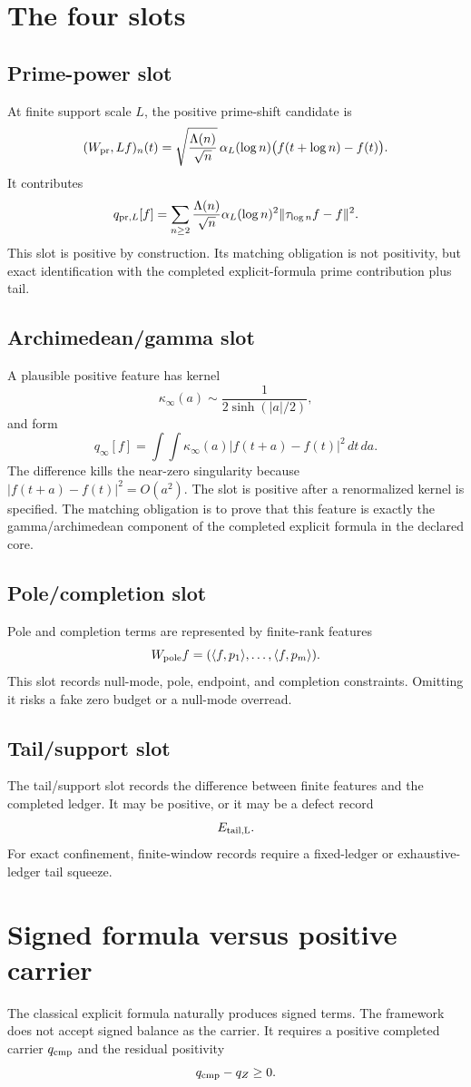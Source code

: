 \documentclass[11pt]{article}
\newcommand{\Wpr}{W_{\rm pr}}
\newcommand{\Wpole}{W_{\rm pole}}
\begin{document}
\section{The four slots}
\subsection{Prime-power slot}
At finite support scale \(L\), the positive prime-shift candidate is
\[
(\Wpr,L f)_n(t)
=\sqrt{\frac{\Lambda(n)}{\sqrt n}}\,\alpha_L(\log n)\bigl(f(t+\log n)-f(t)\bigr).
\]
It contributes
\[
q_{{\rm pr},L}[f]
=\sum_{n\ge2}\frac{\Lambda(n)}{\sqrt n}\alpha_L(\log n)^2\|\tau_{\log n}f-f\|^2.
\]
This slot is positive by construction. Its matching obligation is not positivity, but exact identification with the completed explicit-formula prime contribution plus tail.

\subsection{Archimedean/gamma slot}
A plausible positive feature has kernel
\[
\kappa_\infty(a)\sim \frac{1}{2\sinh(|a|/2)},
\]
and form
\[
q_\infty[f]=\int\!\int\kappa_\infty(a)|f(t+a)-f(t)|^2\,dt\,da.
\]
The difference kills the near-zero singularity because \(|f(t+a)-f(t)|^2=O(a^2)\). The slot is positive after a renormalized kernel is specified. The matching obligation is to prove that this feature is exactly the gamma/archimedean component of the completed explicit formula in the declared core.

\subsection{Pole/completion slot}
Pole and completion terms are represented by finite-rank features
\[
\Wpole f=(\langle f,p_1\rangle,\dots,\langle f,p_m\rangle).
\]
This slot records null-mode, pole, endpoint, and completion constraints. Omitting it risks a fake zero budget or a null-mode overread.

\subsection{Tail/support slot}
The tail/support slot records the difference between finite features and the completed ledger. It may be positive, or it may be a defect record
\[
E_{\rm tail,L}.
\]
For exact confinement, finite-window records require a fixed-ledger or exhaustive-ledger tail squeeze.

\section{Signed formula versus positive carrier}
The classical explicit formula naturally produces signed terms. The framework does not accept signed balance as the carrier. It requires a positive completed carrier \(q_{\rm cmp}\) and the residual positivity
\[
q_{\rm cmp}-q_Z\ge0.
\]
\end{document}
